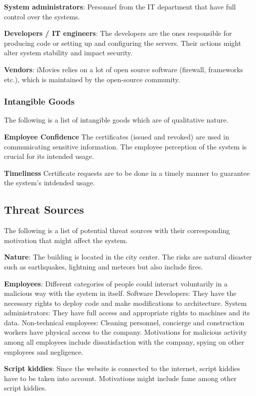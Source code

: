 \documentclass[english]{article}
\begin{document}
\textbf{System administrators}: Personnel from the IT department that have full control over the systems.

\textbf{Developers / IT engineers}: The developers are the ones responsible for producing code or setting up and configuring the servers. Their actions might alter system stability and impact security.

\textbf{Vendors}: iMovies relies on a lot of open source software (firewall, frameworks etc.), which is maintained by the open-source community.

\subsubsection{Intangible Goods}
The following is a list of intangible goods which are of qualitative nature.

\textbf{Employee Confidence} The certificates (issued and revoked) are used in communicating sensitive information. The employee perception of the system is crucial for its intended usage.

\textbf{Timeliness} 
Certificate requests are to be done in a timely manner to guarantee the system's intdended usage.

\subsection{Threat Sources}

The following is a list of potential threat sources with their corresponding motivation that might affect the system.

\textbf{Nature}: The building is located in the city center. The risks are natural disaster such as earthquakes, lightning and meteors but also include fires.

\textbf{Employees}: Different categories of people could interact voluntarily in a malicious way with the system in itself. Software Developers: They have the necessary rights to deploy code and make modifications to architecture. System administrators: They have full access and appropriate rights to machines and its data. Non-technical employees: Cleaning personnel, concierge and construction workers have physical access to the company.
Motivations for malicious activity among all employees include dissatisfaction with the company, spying on other employees and negligence.

\textbf{Script kiddies}: Since the website is connected to the internet, script kiddies have to be taken into account. Motivations might include fame among other script kiddies.
\end{document}
